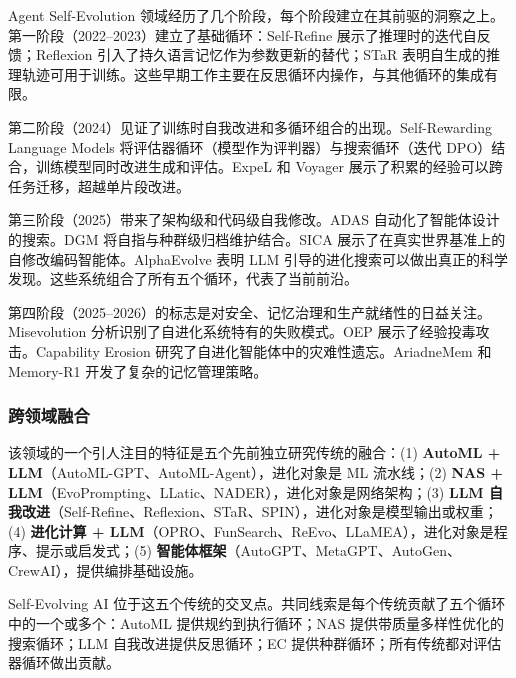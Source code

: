 Agent Self-Evolution 领域经历了几个阶段，每个阶段建立在其前驱的洞察之上。第一阶段（2022--2023）建立了基础循环：Self-Refine 展示了推理时的迭代自反馈；Reflexion 引入了持久语言记忆作为参数更新的替代；STaR 表明自生成的推理轨迹可用于训练。这些早期工作主要在反思循环内操作，与其他循环的集成有限。

第二阶段（2024）见证了训练时自我改进和多循环组合的出现。Self-Rewarding Language Models 将评估器循环（模型作为评判器）与搜索循环（迭代 DPO）结合，训练模型同时改进生成和评估。ExpeL 和 Voyager 展示了积累的经验可以跨任务迁移，超越单片段改进。

第三阶段（2025）带来了架构级和代码级自我修改。ADAS 自动化了智能体设计的搜索。DGM 将自指与种群级归档维护结合。SICA 展示了在真实世界基准上的自修改编码智能体。AlphaEvolve 表明 LLM 引导的进化搜索可以做出真正的科学发现。这些系统组合了所有五个循环，代表了当前前沿。

第四阶段（2025--2026）的标志是对安全、记忆治理和生产就绪性的日益关注。Misevolution 分析识别了自进化系统特有的失败模式。OEP 展示了经验投毒攻击。Capability Erosion 研究了自进化智能体中的灾难性遗忘。AriadneMem 和 Memory-R1 开发了复杂的记忆管理策略。

\subsubsection{跨领域融合}

该领域的一个引人注目的特征是五个先前独立研究传统的融合：(1) \textbf{AutoML + LLM}（AutoML-GPT、AutoML-Agent），进化对象是 ML 流水线；(2) \textbf{NAS + LLM}（EvoPrompting、LLatic、NADER），进化对象是网络架构；(3) \textbf{LLM 自我改进}（Self-Refine、Reflexion、STaR、SPIN），进化对象是模型输出或权重；(4) \textbf{进化计算 + LLM}（OPRO、FunSearch、ReEvo、LLaMEA），进化对象是程序、提示或启发式；(5) \textbf{智能体框架}（AutoGPT、MetaGPT、AutoGen、CrewAI），提供编排基础设施。

Self-Evolving AI 位于这五个传统的交叉点。共同线索是每个传统贡献了五个循环中的一个或多个：AutoML 提供规约到执行循环；NAS 提供带质量多样性优化的搜索循环；LLM 自我改进提供反思循环；EC 提供种群循环；所有传统都对评估器循环做出贡献。

